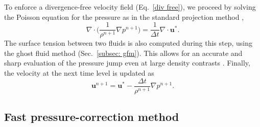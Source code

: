 To enforce a divergence-free velocity field (Eq.\ \eqref{div free}), we proceed by solving the Poisson equation for the pressure as in the standard projection method \cite{Chorin_1968}, \ie
\begin{equation}
  \nabla \cdot \bigg(\frac{1}{\rho^{n+1}} \nabla p^{n+1} \bigg) = \frac{1}{\Delta t}\nabla \cdot {\bm u}^*.
  \label{var poisson}
\end{equation}
\noindent The surface tension between two fluids is also computed during this step, using the ghost fluid method \cite{Fedkiw_JCP_1999} (Sec.\ \ref{subsec: gfm}). This allows for an accurate and sharp evaluation of the pressure jump even at large density contrasts \cite{Desjardins_JCP_2008}. Finally, the velocity at the next time level is updated as
\begin{equation}
    {\bm u}^{n+1} = {\bm u}^* -\frac{\Delta t}{\rho^{n+1}} \nabla p^{n+1}.
  \label{projection}
\end{equation}




\subsection{Fast pressure-correction method}
\label{p correction}


